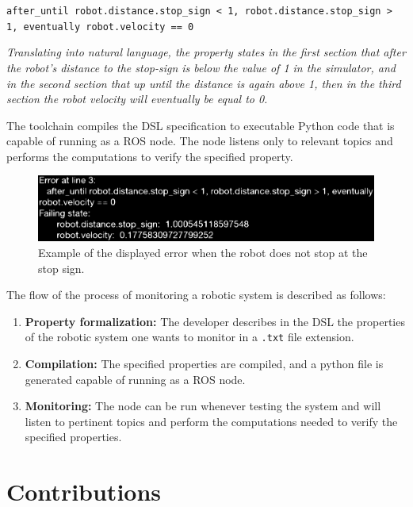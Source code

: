 \texttt{after\_until robot.distance.stop\_sign < 1, robot.distance.stop\_sign > 1, eventually robot.velocity == 0}

\textit{Translating into natural language, the property states in the first section that after the robot's distance to the stop-sign is below the value of 1 in the simulator, and in the second section that up until the distance is again above 1, then in the third section the robot velocity will eventually be equal to 0.}

The toolchain compiles the DSL specification to executable Python code that is capable of running as a ROS node. The node listens only to relevant topics and performs the computations to verify the specified property.

\begin{figure}
\includegraphics[width=\textwidth]{images/error.eps}
\caption{Example of the displayed error when the robot does not stop at the stop sign.} \label{fig:error}
\end{figure}

The flow of the process of monitoring a robotic system is described as follows:

\begin{enumerate}[label=(\roman*)]
    \item \textbf{Property formalization:} The developer describes in the DSL the properties of the robotic system one wants to monitor in a \texttt{.txt} file extension.
    \item \textbf{Compilation:} The specified properties are compiled, and a python file is generated capable of running as a ROS node.
    \item \textbf{Monitoring:} The node can be run whenever testing the system and will listen to pertinent topics and perform the computations needed to verify the specified properties.
\end{enumerate}


\section{Contributions}
\label{sec:contributions}

